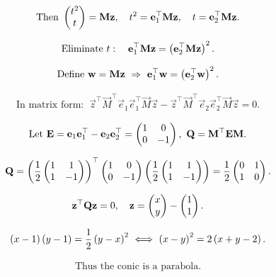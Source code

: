 \documentclass{beamer}
\numberwithin{equation}{section}
\begin{document}
\begin{align}
	\text{Then } \begin{pmatrix}t^2\\ t\end{pmatrix}=\mathbf{M}\mathbf{z},\quad
	t^2=\mathbf{e}_1^\top \mathbf{M}\mathbf{z},\quad
	t=\mathbf{e}_2^\top \mathbf{M}\mathbf{z}.
\end{align}

\begin{align}
\text{Eliminate } t:\quad
	\mathbf{e}_1^\top \mathbf{M}\mathbf{z}
=
	\left(\mathbf{e}_2^\top \mathbf{M}\mathbf{z}\right)^{2}.
\end{align}

\begin{align}
	\text{Define } \mathbf{w}=\mathbf{M}\mathbf{z}\ \Rightarrow\
\mathbf{e}_1^\top\mathbf{w}=\left(\mathbf{e}_2^\top\mathbf{w}\right)^{2}.
\end{align}

\begin{align}
\text{In matrix form: }\
	\vec{z}^\top \vec{M}^\top \vec{e}_1\vec{e}_1^\top \vec{M} \vec{z}
-
	\vec{z}^\top \vec{M}^\top \vec{e}_2\vec{e}_2^\top \vec{M} \vec{z}
=0.
\end{align}

\begin{align}
	\text{Let } \mathbf{E}=\mathbf{e}_1\mathbf{e}_1^\top-\mathbf{e}_2\mathbf{e}_2^\top=\begin{pmatrix}1&0\\ 0&-1\end{pmatrix},\
	\mathbf{Q}=\mathbf{M}^\top \mathbf{E} \mathbf{M}.
\end{align}

\begin{align}
	\mathbf{Q}
=
	\left(\frac{1}{2}\begin{pmatrix}1&1\\ 1&-1\end{pmatrix}\right)^\top
\begin{pmatrix}1&0\\ 0&-1\end{pmatrix}
	\left(\frac{1}{2}\begin{pmatrix}1&1\\ 1&-1\end{pmatrix}\right)
=
\frac{1}{2}\begin{pmatrix}0&1\\ 1&0\end{pmatrix}.
\end{align}

\begin{align}
	\mathbf{z}^\top \mathbf{Q} \mathbf{z}=0,\quad
\mathbf{z}=\begin{pmatrix}x\\ y\end{pmatrix}-\begin{pmatrix}1\\ 1\end{pmatrix}.
\end{align}

\begin{align}
\left(x-1\right)\left(y-1\right)
=
\frac{1}{2}\left(y-x\right)^{2}
\ \Longleftrightarrow\
\left(x-y\right)^{2}=2\left(x+y-2\right).
\end{align}

\begin{align}
\text{Thus the conic is a parabola.}
\end{align}
\end{document}
